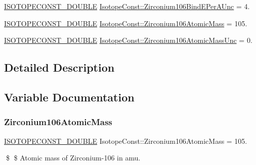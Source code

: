 \begin{DoxyCompactItemize}
\mbox{\hyperlink{group___isotope_const-_macros_ga8f45a7272ce02c0b4c65c44636ed719a}{I\+S\+O\+T\+O\+P\+E\+C\+O\+N\+S\+T\+\_\+\+D\+O\+U\+B\+LE}} \mbox{\hyperlink{group___isotope_const-_zirconium-_zr106_ga2837e2c43b98b725b18164315531b083}{Isotope\+Const\+::\+Zirconium106\+Bind\+E\+Per\+A\+Unc}} = 4.
\item 
\mbox{\hyperlink{group___isotope_const-_macros_ga8f45a7272ce02c0b4c65c44636ed719a}{I\+S\+O\+T\+O\+P\+E\+C\+O\+N\+S\+T\+\_\+\+D\+O\+U\+B\+LE}} \mbox{\hyperlink{group___isotope_const-_zirconium-_zr106_ga57f49e0884afce5984528bf20640047d}{Isotope\+Const\+::\+Zirconium106\+Atomic\+Mass}} = 105.
\item 
\mbox{\hyperlink{group___isotope_const-_macros_ga8f45a7272ce02c0b4c65c44636ed719a}{I\+S\+O\+T\+O\+P\+E\+C\+O\+N\+S\+T\+\_\+\+D\+O\+U\+B\+LE}} \mbox{\hyperlink{group___isotope_const-_zirconium-_zr106_gaaebfff74f5b7e86f6e6fd2d5a66b3f69}{Isotope\+Const\+::\+Zirconium106\+Atomic\+Mass\+Unc}} = 0.
\end{DoxyCompactItemize}


\subsection{Detailed Description}


\subsection{Variable Documentation}
\mbox{\label{group___isotope_const-_zirconium-_zr106_ga57f49e0884afce5984528bf20640047d}} 
\subsubsection{\texorpdfstring{Zirconium106\+Atomic\+Mass}{Zirconium106AtomicMass}}
{\footnotesize\ttfamily \mbox{\hyperlink{group___isotope_const-_macros_ga8f45a7272ce02c0b4c65c44636ed719a}{I\+S\+O\+T\+O\+P\+E\+C\+O\+N\+S\+T\+\_\+\+D\+O\+U\+B\+LE}} Isotope\+Const\+::\+Zirconium106\+Atomic\+Mass = 105.}

\$ \$ Atomic mass of Zirconium-\/106 in amu. \mbox{\label{group___isotope_const-_zirconium-_zr106_gaaebfff74f5b7e86f6e6fd2d5a66b3f69}} 
